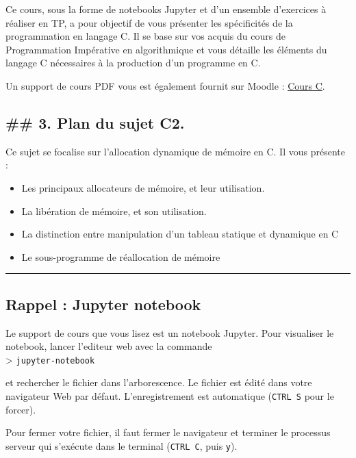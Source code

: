 \documentclass[11pt]{article}
\providecommand{\tightlist}{%
      \setlength{\itemsep}{0pt}\setlength{\parskip}{0pt}}
\begin{document}
Ce cours, sous la forme de notebooks Jupyter et d'un ensemble
d'exercices à réaliser en TP, a pour objectif de vous présenter les
spécificités de la programmation en langage C. Il se base sur vos acquis
du cours de Programmation Impérative en algorithmique et vous détaille
les éléments du langage C nécessaires à la production d'un programme en
C.

Un support de cours PDF vous est également fournit sur Moodle :
\href{http://moodle-n7.inp-toulouse.fr/pluginfile.php/49240/mod_resource/content/5/LangageC_poly.pdf}{Cours
C}.

    \subsection{\#\# 3. Plan du sujet C2.}\label{plan-du-sujet-c2.}

Ce sujet se focalise sur l'allocation dynamique de mémoire en C. Il vous
présente :

\begin{itemize}
\tightlist
\item
  Les principaux allocateurs de mémoire, et leur utilisation.
\item
  La libération de mémoire, et son utilisation.
\item
  La distinction entre manipulation d'un tableau statique et dynamique
  en C
\item
  Le sous-programme de réallocation de mémoire
\end{itemize}

    \begin{center}\rule{0.5\linewidth}{\linethickness}\end{center}

    \subsection{Rappel : Jupyter notebook}\label{rappel-jupyter-notebook}

Le support de cours que vous lisez est un notebook Jupyter. Pour
visualiser le notebook, lancer l'editeur web avec la commande\\
\textgreater{} \texttt{jupyter-notebook}

et rechercher le fichier dans l'arborescence. Le fichier est édité dans
votre navigateur Web par défaut. L'enregistrement est automatique
(\texttt{CTRL\ S} pour le forcer).

Pour fermer votre fichier, il faut fermer le navigateur et terminer le
processus serveur qui s'exécute dans le terminal (\texttt{CTRL\ C}, puis
\texttt{y}).
\end{document}
